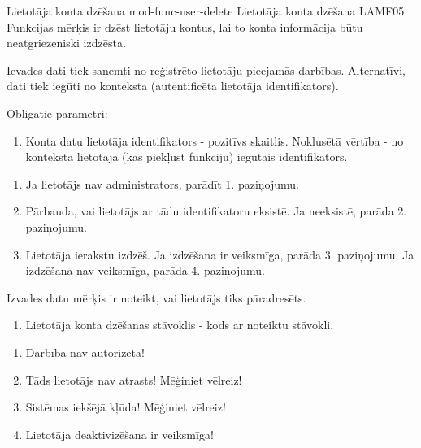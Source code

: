 \moduleFunctionTable
{Lietotāja konta dzēšana}
{mod-func-user-delete}
{Lietotāja konta dzēšana}
{LAMF05}
{
	Funkcijas mērķis ir dzēst lietotāju kontus, lai to konta informācija būtu neatgriezeniski izdzēsta.
}
{
	Ievades dati tiek saņemti no reģistrēto lietotāju pieejamās darbības.
	Alternatīvi, dati tiek iegūti no konteksta (autentificēta lietotāja identifikators).

	Obligātie parametri:
	\begin{enumerate}
		\item Konta datu lietotāja identifikators - pozitīvs skaitlis.
		      Noklusētā vērtība - no konteksta lietotāja (kas piekļūst funkciju) iegūtais identifikators.
	\end{enumerate}
}
{
	\begin{enumerate}
		\item Ja lietotājs nav administrators, parādīt 1. paziņojumu.
		\item Pārbauda, vai lietotājs ar tādu identifikatoru eksistē.
		      Ja neeksistē, parāda 2. paziņojumu.
		\item Lietotāja ierakstu izdzēš.
		      Ja izdzēšana ir veiksmīga, parāda 3. paziņojumu.
		      Ja izdzēšana nav veiksmīga, parāda 4. paziņojumu.
	\end{enumerate}
}
{
	Izvades datu mērķis ir noteikt, vai lietotājs tiks pāradresēts.
	\begin{enumerate}
		\item Lietotāja konta dzēšanas stāvoklis - kods ar noteiktu stāvokli.
	\end{enumerate}
}
{
	\begin{enumerate}
		\item Darbība nav autorizēta!
		\item Tāds lietotājs nav atrasts! Mēģiniet vēlreiz!
		\item Sistēmas iekšējā kļūda! Mēģiniet vēlreiz!
		\item Lietotāja deaktivizēšana ir veiksmīga!
	\end{enumerate}
}
